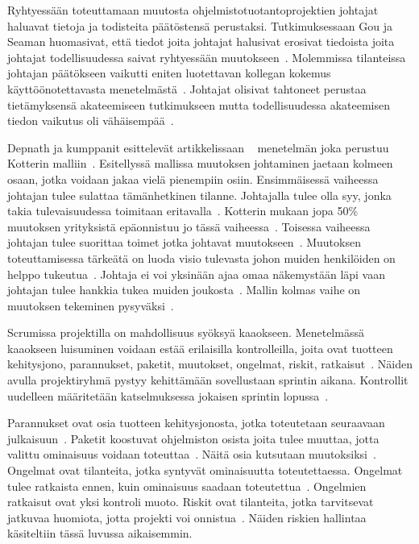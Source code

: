 \documentclass[finnish]{tktltiki2}
\theoremstyle{definition}
\theoremstyle{remark}
\begin{document}
Ryhtyessään toteuttamaan muutosta ohjelmistotuotantoprojektien johtajat haluavat tietoja ja todisteita päätöstensä perustaksi. Tutkimuksessaan Gou ja Seaman huomasivat, että tiedot joita johtajat halusivat erosivat tiedoista joita johtajat todellisuudessa saivat ryhtyessään muutokseen~\cite{Guo:2008:SSP:1414004.1414046}. Molemmissa tilanteissa johtajan päätökseen vaikutti eniten luotettavan kollegan kokemus käyttöönotettavasta menetelmästä~\cite{Guo:2008:SSP:1414004.1414046}. Johtajat olisivat tahtoneet perustaa tietämyksensä akateemiseen tutkimukseen mutta todellisuudessa akateemisen tiedon vaikutus oli vähäisempää~\cite{Guo:2008:SSP:1414004.}.

Depnath ja kumppanit esittelevät artikkelissaan ~\cite{4017705} menetelmän joka perustuu Kotterin malliin~\cite{kotter1995leading}. Esitellyssä mallissa muutoksen johtaminen jaetaan kolmeen osaan, jotka voidaan jakaa vielä pienempiin osiin. Ensimmäisessä vaiheessa johtajan tulee sulattaa tämänhetkinen tilanne. Johtajalla tulee olla syy, jonka takia tulevaisuudessa toimitaan eritavalla~\cite{4017705}. Kotterin mukaan jopa 50\% muutoksen yrityksistä epäonnistuu jo tässä vaiheessa~\cite{kotter1995leading}. Toisessa vaiheessa johtajan tulee suorittaa toimet jotka johtavat muutokseen~\cite{4017705}. Muutoksen toteuttamisessa tärkeätä on luoda visio tulevasta johon muiden henkilöiden on helppo tukeutua~\cite{4017705}. Johtaja ei voi yksinään ajaa omaa näkemystään läpi vaan johtajan tulee hankkia tukea muiden joukosta~\cite{4017705}. Mallin kolmas vaihe on muutoksen tekeminen pysyväksi~\cite{4017705}.

Scrumissa projektilla on mahdollisuus syöksyä kaaokseen. Menetelmässä kaaokseen luisuminen voidaan estää erilaisilla kontrolleilla, joita ovat tuotteen kehitysjono, parannukset, paketit, muutokset, ongelmat, riskit, ratkaisut~\cite{schwaber1995scrum}. Näiden avulla projektiryhmä pystyy kehittämään sovellustaan sprintin aikana. Kontrollit uudelleen määritetään katselmuksessa jokaisen sprintin lopussa~\cite{schwaber1995scrum}.

Parannukset ovat osia tuotteen kehitysjonosta, jotka toteutetaan seuraavaan julkaisuun~\cite{schwaber1995scrum}. Paketit koostuvat ohjelmiston osista joita tulee muuttaa, jotta valittu ominaisuus voidaan toteuttaa~\cite{schwaber1995scrum}. Näitä osia kutsutaan muutoksiksi~\cite{schwaber1995scrum}. Ongelmat ovat tilanteita, jotka syntyvät ominaisuutta toteutettaessa. Ongelmat tulee ratkaista ennen, kuin ominaisuus saadaan toteutettua~\cite{schwaber1995scrum}. Ongelmien ratkaisut ovat yksi kontroli muoto. Riskit ovat tilanteita, jotka tarvitsevat jatkuvaa huomiota, jotta projekti voi onnistua~\cite{schwaber1995scrum}. Näiden riskien hallintaa käsiteltiin tässä luvussa aikaisemmin. 
\end{document}
